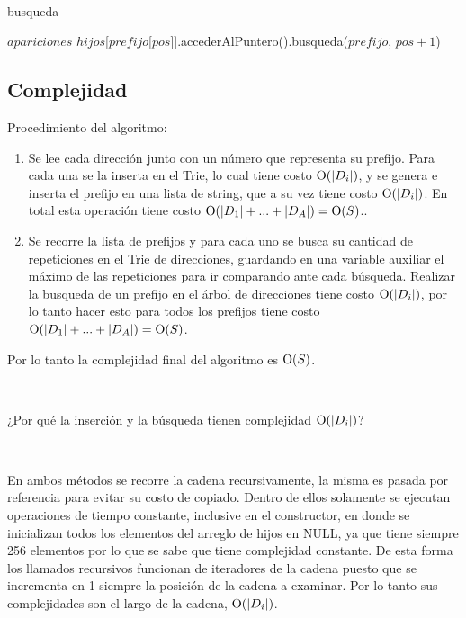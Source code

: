 ~

\begin{algorithm}[H]
	\caption{busqueda}

	 {
		\Return $apariciones$ \;
	} {
		 {
			 \;
		} {
			\Return $hijos$[$prefijo$[$pos$]].accederAlPuntero().busqueda($prefijo$, $pos + 1$) \;
		}
	}
\end{algorithm}

\subsection{Complejidad}

Procedimiento del algoritmo:

\begin{enumerate}
\item Se lee cada dirección junto con un número que representa su prefijo.
Para cada una se la inserta en el Trie, lo cual tiene costo $\operatorname{O}(|D_i|)$, y
se genera e inserta el prefijo en una lista de string, que a su vez tiene
costo $\operatorname{O}(|D_i|)$. En total esta operación tiene costo
$\operatorname{O}(|D_1| + ... + |D_A|) = \operatorname{O}(S)$..
\item Se recorre la lista de prefijos y para cada uno se busca su cantidad de
repeticiones en el Trie de direcciones, guardando en una variable auxiliar el
máximo de las repeticiones para ir comparando ante cada búsqueda. Realizar
la busqueda de un prefijo en el árbol de direcciones tiene costo
$\operatorname{O}(|D_i|)$, por lo tanto hacer esto para todos los prefijos tiene costo
$\operatorname{O}(|D_1| + ... + |D_A|) = \operatorname{O}(S)$.
\end{enumerate}

Por lo tanto la complejidad final del algoritmo es $\operatorname{O}(S)$.

~

¿Por qué la inserción y la búsqueda tienen complejidad $\operatorname{O}(|D_i|)$?

~

En ambos métodos se recorre la cadena recursivamente, la misma es pasada por
referencia para evitar su costo de copiado. Dentro de ellos solamente se
ejecutan operaciones de tiempo constante, inclusive en el constructor, en
donde se inicializan todos los elementos del arreglo de hijos en NULL, ya que
tiene siempre 256 elementos por lo que se sabe que tiene complejidad
constante. De esta forma los llamados recursivos funcionan de iteradores de la
cadena puesto que se incrementa en 1 siempre la posición de la cadena a
examinar. Por lo tanto sus complejidades son el largo de la cadena,
$\operatorname{O}(|D_i|)$.
